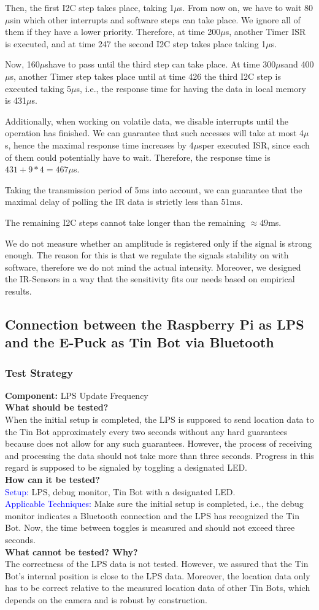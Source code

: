 \documentclass[a4paper,parskip,headheight=38pt]{scrartcl} %
\newcommand{\teststrat}[5]{
    \subsubsection{Test Strategy}
	\textbf{Component:} #1 \\
	\noindent\textbf{What should be tested?} \\
    \noindent #2 \\
	\noindent\textbf{How can it be tested?} \\
    \noindent\textcolor{blue}{Setup:} #3 \\
    \noindent\textcolor{blue}{Applicable Techniques:} #4 \\
	\noindent\textbf{What cannot be tested? Why?} \\
    \noindent #5
}
\newcommand{\ie}{i.e.}
\newcommand{\mics}{$\mu$s}
\begin{document}
{    Then, the first I2C step takes place, taking 1\mics. From now on, we have to
    wait 80\mics in which other interrupts and software steps can take place.
    We ignore all of them if they have a lower priority. Therefore, at time
    200\mics, another Timer ISR is executed, and at time 247 the second I2C step
    takes place taking 1\mics. 

    Now, 160\mics have to pass until the third step can take place. At
    time 300\mics and 400\mics, another Timer step takes place until at time
    426 the third I2C step is executed taking 5\mics, \ie, the response time for
    having the data in local memory is 431\mics.

    Additionally, when working on volatile data, we disable interrupts until the
    operation has finished. We can guarantee that such accesses will take at
    most 4\mics, hence the maximal response time increases by 4\mics per
    executed ISR, since each of them could potentially have to wait. Therefore,
    the response time is $431 + 9 * 4 = 467$\mics.

    Taking the transmission period of 5ms into account, we can guarantee that
    the maximal delay of polling the IR data is strictly less than 51ms.

    The remaining I2C steps cannot take longer than the remaining $\approx
    49$ms.
}{
   We do not measure whether an amplitude is registered only if the signal is
   strong enough. The reason for this is that we regulate the signals stability
   on with software, therefore we do not mind the actual intensity. Moreover, we
   designed the IR-Sensors in a way that the sensitivity fits our needs based on
   empirical results.
}

\subsection{Connection between the Raspberry Pi as LPS and the E-Puck as Tin Bot
via Bluetooth}

\teststrat{LPS Update Frequency}{
    When the initial setup is completed, the LPS is supposed to send location
    data
    to the Tin Bot approximately every two seconds without any hard guarantees
    because does not allow for any such guarantees.
    However, the process of receiving and processing the data should not take
    more than three seconds. Progress in this regard is supposed to be signaled
    by toggling a designated LED.
}{
    LPS, debug monitor, Tin Bot with a designated LED.
}{
    Make sure the initial setup is completed, \ie, the debug monitor indicates a
    Bluetooth connection and the LPS has recognized the Tin Bot. Now, the time
    between toggles is measured and should not exceed three seconds.
}{
    The correctness of the LPS data is not tested. However, we assured that the
    Tin Bot's internal position is close to the LPS data. Moreover, the location
    data only has to be correct relative to the measured location data of other
    Tin
    Bots, which depends on the camera and is robust by construction.
}
\end{document}
